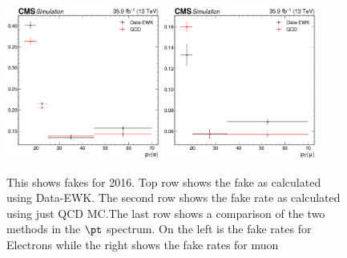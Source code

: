 \begin{figure}
  \includegraphics[width=0.45\textwidth]{measurement/2016/fr_Electron_pt.png} \hfill
  \includegraphics[width=0.45\textwidth]{measurement/2016/fr_Muon_pt.png} \\
  \caption{This shows fakes for 2016. Top row shows the fake as calculated using Data-EWK. The second row shows the fake rate as calculated using just QCD MC.\@ The last row shows a comparison of the two methods in the $\pt$ spectrum. On the left is the fake rates for Electrons while the right shows the fake rates for muon}
\end{figure}

